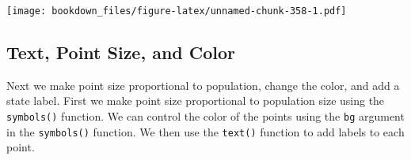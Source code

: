 \documentclass[]{krantz}
\makeatletter
\newenvironment{Shaded}{\begin{snugshade}}{\end{snugshade}}
\newcommand{\KeywordTok}[1]{\textcolor[rgb]{0.27,0.27,0.27}{\textbf{#1}}}
\newcommand{\DataTypeTok}[1]{\textcolor[rgb]{0.27,0.27,0.27}{#1}}
\newcommand{\DecValTok}[1]{\textcolor[rgb]{0.06,0.06,0.06}{#1}}
\newcommand{\StringTok}[1]{\textcolor[rgb]{0.5,0.5,0.5}{#1}}
\newcommand{\OtherTok}[1]{\textcolor[rgb]{0.37,0.37,0.37}{#1}}
\newcommand{\OperatorTok}[1]{\textcolor[rgb]{0.43,0.43,0.43}{\textbf{#1}}}
\newcommand{\NormalTok}[1]{#1}
\newenvironment{kframe}{%
\medskip{}
\setlength{\fboxsep}{.8em}
 \def\at@end@of@kframe{}%
 \ifinner\ifhmode%
  \def\at@end@of@kframe{\end{minipage}}%
  \begin{minipage}{\columnwidth}%
 \fi\fi%
 \def\FrameCommand##1{\hskip\@totalleftmargin \hskip-\fboxsep
 \colorbox{shadecolor}{##1}\hskip-\fboxsep
     \hskip-\linewidth \hskip-\@totalleftmargin \hskip\columnwidth}%
 \MakeFramed {\advance\hsize-\width
   \@totalleftmargin\z@ \linewidth\hsize
   \@setminipage}}%
 {\par\unskip\endMakeFramed%
 \at@end@of@kframe}
\renewenvironment{Shaded}{\begin{kframe}}{\end{kframe}}
\makeatother
\begin{document}
\begin{Shaded}
\end{Shaded}

\texttt{[image: bookdown\_files/figure-latex/unnamed-chunk-358-1.pdf]}

\subsection{Text, Point Size, and
Color}\label{text-point-size-and-color-1}

Next we make point size proportional to population, change the color,
and add a state label. First we make point size proportional to
population size using the \texttt{symbols()} function. We can control
the color of the points using the \texttt{bg} argument in the
\texttt{symbols()} function. We then use the \texttt{text()} function to
add labels to each point.
\end{document}
